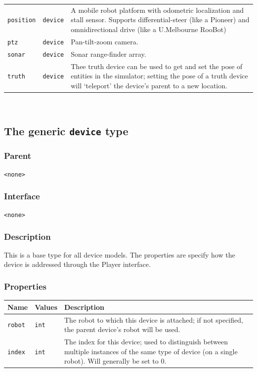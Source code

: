 \documentclass[11pt,twoside]{report}
\begin{document}
\begin{tabularx}{\columnwidth}{llX}
\verb'position' & \verb'device' & A mobile robot platform with
odometric localization and stall sensor. Supports differential-steer
(like a Pioneer) and omnidirectional drive (like a U.Melbourne
RooBot)\\

\verb'ptz' & \verb'device' & Pan-tilt-zoom camera. \\

\verb'sonar' & \verb'device' & Sonar range-finder array.\\

\verb'truth' & \verb'device' & Thee truth device can be used to get
and set the pose of entities in the simulator; setting the pose of a
truth device will `teleport' the device's parent to a new location.\\

\hline
\end{tabularx}
\vspace{1em}\\

\newpage
\subsection{The generic {\tt device} type}

\subsubsection*{Parent}
{\tt <none>}

\subsubsection*{Interface}
{\tt <none>}


\subsubsection*{Description}
This is a base type for all device models. The properties are specify
how the device is addressed through the Player interface.

\subsubsection*{Properties}
\begin{tabularx}{\columnwidth}{llX}
\hline
Name & Values & Description \\
\hline

\verb'robot' & \verb'int' & The robot to which this device is attached;
if not specified, the parent device's robot will be used.\\

\verb'index' & \verb'int' & The index for this device; used to
distinguish between multiple instances of the same type of device (on
a single robot).  Will generally be set to 0.\\

\hline
\end{tabularx}
\end{document}
